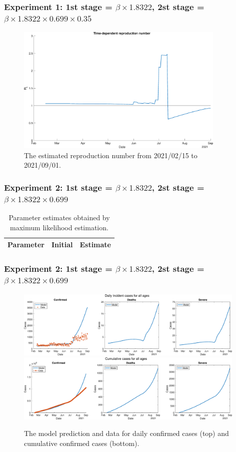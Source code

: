 \documentclass[aspectratio=169, 9pt, xcolor=dvipsnames]{beamer}
\begin{document}
	\begin{frame}\frametitle{Experiment 1: 1st stage = $\beta \times 1.8322$, 2st stage = $\beta \times 1.8322 \times 0.699 \times 0.35$}
	    \begin{figure}
	    	\centering
	    	\includegraphics[width=10cm]{../results/estimate_sd_1st_1_2nd_1/rep_num.eps}
	    	\caption{The estimated reproduction number from 2021/02/15 to 2021/09/01.}
	    \end{figure}
	\end{frame}

	\begin{frame}\frametitle{Experiment 2: 1st stage = $\beta \times 1.8322$, 2st stage = $\beta \times 1.8322 \times 0.699$}
	    \begin{table}
	    	\begin{tabular}{crr}
	    		\toprule
	    		\textbf{Parameter} & \textbf{Initial} & \textbf{Estimate} \\
	    		\midrule
	    		
	    		\bottomrule
	    	\end{tabular}
	    	\caption{Parameter estimates obtained by maximum likelihood estimation.}
	    \end{table}
	\end{frame}

	\begin{frame}\frametitle{Experiment 2: 1st stage = $\beta \times 1.8322$, 2st stage = $\beta \times 1.8322 \times 0.699$}
	    \begin{figure}
	    	\centering
	    	\includegraphics[width=11cm]{../results/estimate_sd_1st_1_2nd_2/daily_all_age.eps}
	    	\includegraphics[width=11cm]{../results/estimate_sd_1st_1_2nd_2/cumul_all_age.eps}
	    	\caption{The model prediction and data for daily confirmed cases (top) and cumulative confirmed cases (bottom).}
	    \end{figure}
	\end{frame}
\end{document}
